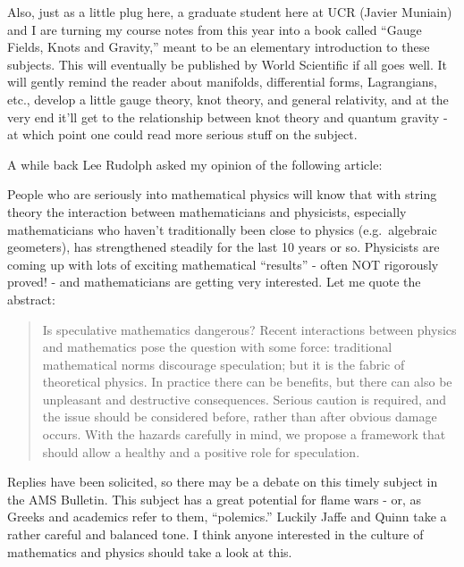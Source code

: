 \documentclass{article}
\def\tightlist{}
\renewcommand{\texttt}[1]{%
  \begingroup
  \ttfamily
  \begingroup\lccode`~=`/\lowercase{\endgroup\def~}{/\discretionary{}{}{}}%
  \begingroup\lccode`~=`[\lowercase{\endgroup\def~}{[\discretionary{}{}{}}%
  \begingroup\lccode`~=`.\lowercase{\endgroup\def~}{.\discretionary{}{}{}}%
  \catcode`/=\active\catcode`[=\active\catcode`.=\active
  \scantokens{#1\noexpand}%
  \endgroup
}
\begin{document}
Also, just as a little plug here, a graduate student here at UCR (Javier
Muniain) and I are turning my course notes from this year into a book
called ``Gauge Fields, Knots and Gravity,'' meant to be an elementary
introduction to these subjects. This will eventually be published by
World Scientific if all goes well. It will gently remind the reader
about manifolds, differential forms, Lagrangians, etc., develop a little
gauge theory, knot theory, and general relativity, and at the very end
it'll get to the relationship between knot theory and quantum gravity -
at which point one could read more serious stuff on the subject.

A while back Lee Rudolph asked my opinion of the following article:


People who are seriously into mathematical physics will know that with
string theory the interaction between mathematicians and physicists,
especially mathematicians who haven't traditionally been close to
physics (e.g.~algebraic geometers), has strengthened steadily for the
last 10 years or so. Physicists are coming up with lots of exciting
mathematical ``results'' - often NOT rigorously proved! - and
mathematicians are getting very interested. Let me quote the abstract:

\begin{quote}
Is speculative mathematics dangerous? Recent interactions between
physics and mathematics pose the question with some force: traditional
mathematical norms discourage speculation; but it is the fabric of
theoretical physics. In practice there can be benefits, but there can
also be unpleasant and destructive consequences. Serious caution is
required, and the issue should be considered before, rather than after
obvious damage occurs. With the hazards carefully in mind, we propose a
framework that should allow a healthy and a positive role for
speculation.
\end{quote}

Replies have been solicited, so there may be a debate on this timely
subject in the AMS Bulletin. This subject has a great potential for
flame wars - or, as Greeks and academics refer to them, ``polemics.''
Luckily Jaffe and Quinn take a rather careful and balanced tone. I think
anyone interested in the culture of mathematics and physics should take
a look at this.
\end{document}
